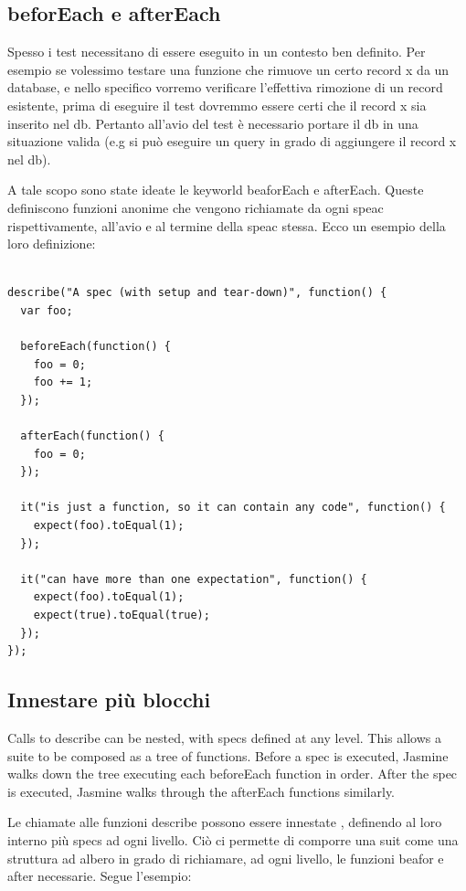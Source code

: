 \documentclass[10pt,a4paper,onecolumn]{article}
\begin{document}
\subsection{beforEach e afterEach}

Spesso i test necessitano di essere eseguito in un contesto ben definito. Per esempio se volessimo testare una funzione che rimuove un certo record x da un database, e nello specifico vorremo verificare l'effettiva rimozione di un record esistente, prima di eseguire il test dovremmo essere certi che il record x sia inserito nel db. Pertanto all'avio del test è necessario portare il db in una situazione valida (e.g si può eseguire un query in grado di aggiungere il record x nel db).

A tale scopo sono state ideate le keyworld beaforEach e afterEach. Queste definiscono funzioni anonime che vengono richiamate da ogni speac rispettivamente, all'avio e al termine della speac stessa. Ecco un esempio della loro definizione:

\begin{lstlisting}

describe("A spec (with setup and tear-down)", function() {
  var foo;

  beforeEach(function() {
    foo = 0;
    foo += 1;
  });

  afterEach(function() {
    foo = 0;
  });

  it("is just a function, so it can contain any code", function() {
    expect(foo).toEqual(1);
  });

  it("can have more than one expectation", function() {
    expect(foo).toEqual(1);
    expect(true).toEqual(true);
  });
});

\end{lstlisting}

\subsection{Innestare più blocchi}

Calls to describe can be nested, with specs defined at any level. This allows a suite to be composed as a tree of functions. Before a spec is executed, Jasmine walks down the tree executing each beforeEach function in order. After the spec is executed, Jasmine walks through the afterEach functions similarly.

Le chiamate alle funzioni describe possono essere innestate , definendo al loro interno più specs ad ogni livello. Ciò ci permette di comporre una suit come una struttura ad albero in grado di richiamare, ad ogni livello, le funzioni beafor e after necessarie. Segue l'esempio:
\end{document}
